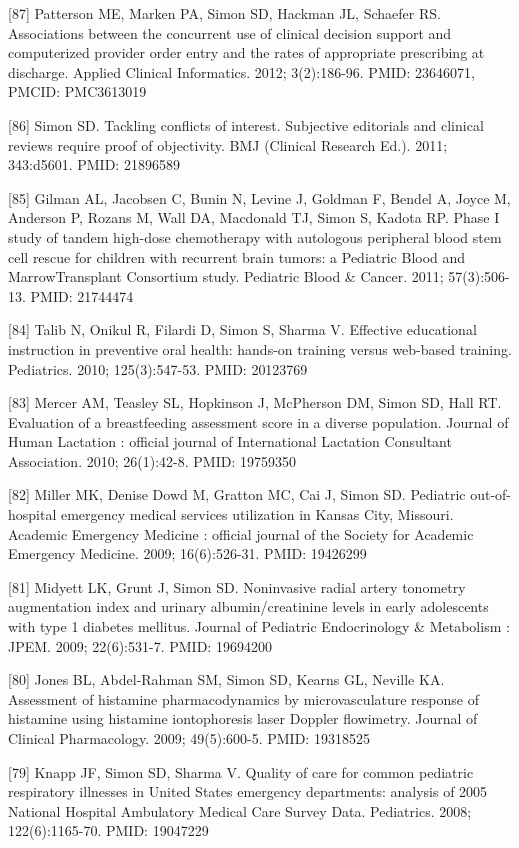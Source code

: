 \documentclass[
  12pt,
]{article}
\begin{document}
{[}87{]} Patterson ME, Marken PA, Simon SD, Hackman JL, Schaefer RS.
Associations between the concurrent use of clinical decision support and
computerized provider order entry and the rates of appropriate
prescribing at discharge. Applied Clinical Informatics. 2012;
3(2):186-96. PMID: 23646071, PMCID: PMC3613019

{[}86{]} Simon SD. Tackling conflicts of interest. Subjective editorials
and clinical reviews require proof of objectivity. BMJ (Clinical
Research Ed.). 2011; 343:d5601. PMID: 21896589

{[}85{]} Gilman AL, Jacobsen C, Bunin N, Levine J, Goldman F, Bendel A,
Joyce M, Anderson P, Rozans M, Wall DA, Macdonald TJ, Simon S, Kadota
RP. Phase I study of tandem high-dose chemotherapy with autologous
peripheral blood stem cell rescue for children with recurrent brain
tumors: a Pediatric Blood and MarrowTransplant Consortium study.
Pediatric Blood \& Cancer. 2011; 57(3):506-13. PMID: 21744474

{[}84{]} Talib N, Onikul R, Filardi D, Simon S, Sharma V. Effective
educational instruction in preventive oral health: hands-on training
versus web-based training. Pediatrics. 2010; 125(3):547-53. PMID:
20123769

{[}83{]} Mercer AM, Teasley SL, Hopkinson J, McPherson DM, Simon SD,
Hall RT. Evaluation of a breastfeeding assessment score in a diverse
population. Journal of Human Lactation : official journal of
International Lactation Consultant Association. 2010; 26(1):42-8. PMID:
19759350

{[}82{]} Miller MK, Denise Dowd M, Gratton MC, Cai J, Simon SD.
Pediatric out-of-hospital emergency medical services utilization in
Kansas City, Missouri. Academic Emergency Medicine : official journal of
the Society for Academic Emergency Medicine. 2009; 16(6):526-31. PMID:
19426299

{[}81{]} Midyett LK, Grunt J, Simon SD. Noninvasive radial artery
tonometry augmentation index and urinary albumin/creatinine levels in
early adolescents with type 1 diabetes mellitus. Journal of Pediatric
Endocrinology \& Metabolism : JPEM. 2009; 22(6):531-7. PMID: 19694200

{[}80{]} Jones BL, Abdel-Rahman SM, Simon SD, Kearns GL, Neville KA.
Assessment of histamine pharmacodynamics by microvasculature response of
histamine using histamine iontophoresis laser Doppler flowimetry.
Journal of Clinical Pharmacology. 2009; 49(5):600-5. PMID: 19318525

{[}79{]} Knapp JF, Simon SD, Sharma V. Quality of care for common
pediatric respiratory illnesses in United States emergency departments:
analysis of 2005 National Hospital Ambulatory Medical Care Survey Data.
Pediatrics. 2008; 122(6):1165-70. PMID: 19047229
\end{document}
